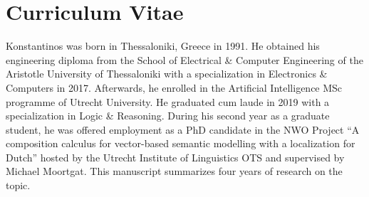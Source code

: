 \chapter{Curriculum Vitae}
Konstantinos was born in Thessaloniki, Greece in 1991.
He obtained his engineering diploma from the School of Electrical \& Computer Engineering of the Aristotle University of Thessaloniki with a specialization in Electronics \& Computers in 2017.
Afterwards, he enrolled in the Artificial Intelligence MSc programme of Utrecht University. 
He graduated cum laude in 2019 with a specialization in Logic \& Reasoning.
During his second year as a graduate student, he was offered employment as a PhD candidate in the NWO Project ``A composition calculus for vector-based semantic modelling with a localization for Dutch'' hosted by the Utrecht Institute of Linguistics OTS and supervised by Michael Moortgat.
This manuscript summarizes four years of research on the topic.
